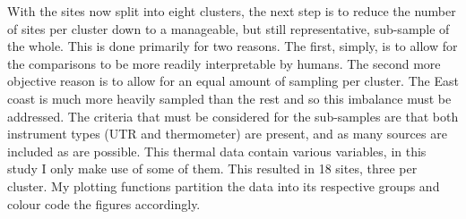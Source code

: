 \documentclass[10pt,a4,]{article}
\newenvironment{Shaded}{\begin{snugshade}}{\end{snugshade}}
\newcommand{\DataTypeTok}[1]{\textcolor[rgb]{0.13,0.29,0.53}{#1}}
\newcommand{\DecValTok}[1]{\textcolor[rgb]{0.00,0.00,0.81}{#1}}
\newcommand{\FloatTok}[1]{\textcolor[rgb]{0.00,0.00,0.81}{#1}}
\newcommand{\KeywordTok}[1]{\textcolor[rgb]{0.13,0.29,0.53}{\textbf{#1}}}
\newcommand{\NormalTok}[1]{#1}
\newcommand{\OperatorTok}[1]{\textcolor[rgb]{0.81,0.36,0.00}{\textbf{#1}}}
\newcommand{\StringTok}[1]{\textcolor[rgb]{0.31,0.60,0.02}{#1}}
\begin{document}
\begin{Shaded}
\end{Shaded}

With the sites now split into eight clusters, the next step is to reduce
the number of sites per cluster down to a manageable, but still
representative, sub-sample of the whole. This is done primarily for two
reasons. The first, simply, is to allow for the comparisons to be more
readily interpretable by humans. The second more objective reason is to
allow for an equal amount of sampling per cluster. The East coast is
much more heavily sampled than the rest and so this imbalance must be
addressed. The criteria that must be considered for the sub-samples are
that both instrument types (UTR and thermometer) are present, and as
many sources are included as are possible. This thermal data contain
various variables, in this study I only make use of some of them. This
resulted in 18 sites, three per cluster. My plotting functions partition
the data into its respective groups and colour code the figures
accordingly.
\end{document}
